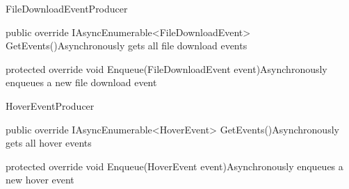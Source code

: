 \begin{class}{FileDownloadEventProducer} 
    


    \begin{methods}
        \begin{method}{public override IAsyncEnumerable<FileDownloadEvent> GetEvents()}{Asynchronously gets all file download events}
        \end{method}
        \begin{method}{ protected override void Enqueue(FileDownloadEvent event)}{Asynchronously enqueues a new file download event}
            \begin{parameters}
            \end{parameters}
        \end{method}
    \end{methods}
\end{class}

\begin{class}{HoverEventProducer} 
    


    \begin{methods}
        \begin{method}{public override IAsyncEnumerable<HoverEvent> GetEvents()}{Asynchronously gets all hover events}
        \end{method}
        \begin{method}{ protected override void Enqueue(HoverEvent event)}{Asynchronously enqueues a new hover event}
            \begin{parameters}
            \end{parameters}
        \end{method}
    \end{methods}
\end{class}

